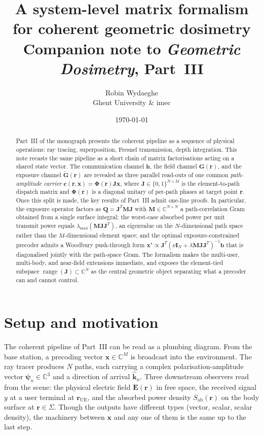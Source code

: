 \documentclass[11pt,a4paper]{article}
\title{\textbf{A system-level matrix formalism\\ for coherent geometric dosimetry}\\[0.3em]
\large Companion note to \emph{Geometric Dosimetry}, Part~III}
\author{Robin Wydaeghe \\[-0.2em] \small Ghent University \& imec}
\date{\today}
\theoremstyle{definition}
\newcommand{\khat}{\hat{\bm{k}}}
\newcommand{\rr}{\mathbf{r}}
\newcommand{\EE}{\mathbf{E}}
\newcommand{\Sab}{S_{\mathrm{ab}}}
\newcommand{\Complex}{\mathbb{C}}
\newcommand{\Jmat}{\mathbf{J}}                 %
\newcommand{\Phimat}{\mathbf{\Phi}}            %
\newcommand{\Mmat}{\mathbf{M}}                 %
\newcommand{\Qmat}{\mathbf{Q}}                 %
\newcommand{\xx}{\mathbf{x}}
\newcommand{\hh}{\mathbf{h}}
\newcommand{\cvec}{\mathbf{c}}
\newcommand{\bvec}{\mathbf{b}}
\newcommand{\psin}{\bm{\psi}_n}
\newcommand{\GG}{\mathbf{G}}
\newcommand{\Gtil}{\tilde{\mathbf{G}}}
\newcommand{\Id}{\mathbf{I}}
\newcommand{\Sigmabody}{\Sigma}
\begin{document}
\maketitle

\begin{abstract}
Part~III of the monograph presents the coherent pipeline as a sequence of physical
operations: ray tracing, superposition, Fresnel transmission, depth
integration.  This note recasts the same pipeline as a short chain of matrix
factorisations acting on a shared state vector.  The communication channel
$\hh$, the field channel $\GG(\rr)$, and the exposure channel
$\Gtil(\rr)$ are revealed as three parallel read-outs of one common
\emph{path-amplitude carrier}
$\cvec(\rr,\xx)=\Phimat(\rr)\Jmat\xx$, where
$\Jmat\in\{0,1\}^{N\times M}$ is the element-to-path dispatch matrix and
$\Phimat(\rr)$ is a diagonal unitary of per-path phases at target point
$\rr$.  Once this split is made, the key results of Part~III admit one-line
proofs.  In particular, the exposure operator factors as
$\Qmat=\Jmat^T\Mmat\Jmat$ with $\Mmat\in\Complex^{N\times N}$ a
path-correlation Gram obtained from a single surface integral; the
worst-case absorbed power per unit transmit power equals
$\lambda_{\max}(\Mmat\Jmat\Jmat^T)$, an eigenvalue on the $N$-dimensional
path space rather than the $M$-dimensional element space; and the optimal
exposure-constrained precoder admits a Woodbury push-through form
$\xx^\star\propto\Jmat^T(\nu\Id_N+\lambda\Mmat\Jmat\Jmat^T)^{-1}\bvec$
that is diagonalised jointly with the path-space Gram.  The formalism
makes the multi-user, multi-body, and near-field extensions immediate, and
exposes the element-tied subspace $\operatorname{range}(\Jmat)\subset\Complex^N$
as the central geometric object separating what a precoder can and cannot
control.
\end{abstract}

\section{Setup and motivation}\label{sec:motivation}

The coherent pipeline of Part~III can be read as a plumbing diagram.  From
the base station, a precoding vector $\xx\in\Complex^M$ is broadcast into
the environment.  The ray tracer produces $N$ paths, each carrying a complex
polarisation-amplitude vector $\psin\in\Complex^3$ and a direction of
arrival $\khat_n$.  Three downstream observers read from the scene: the
physical electric field $\EE(\rr)$ in free space, the received signal $y$
at a user terminal at $\rr_\mathrm{UE}$, and the absorbed power density
$\Sab(\rr)$ on the body surface at $\rr\in\Sigmabody$.  Though the outputs
have different types (vector, scalar, scalar density), the machinery between
$\xx$ and any one of them is the same up to the last step.
\end{document}

